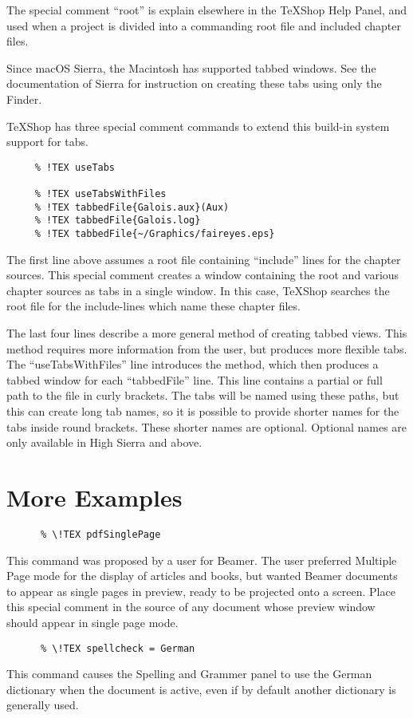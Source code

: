 \documentclass[11pt, oneside]{article}   	%
\begin{document}
 The special comment ``root'' is explain elsewhere in the TeXShop Help Panel, and used when a project is divided into a commanding root file and included chapter files. 
 
 Since macOS Sierra, the Macintosh has supported tabbed windows. See the documentation of Sierra for  instruction on creating these tabs using only the Finder. 
  
 TeXShop has three special comment commands to extend this build-in system support for tabs. 
 
 \begin{verbatim}
     % !TEX useTabs
	
     % !TEX useTabsWithFiles
     % !TEX tabbedFile{Galois.aux}(Aux)
     % !TEX tabbedFile{Galois.log}
     % !TEX tabbedFile{~/Graphics/faireyes.eps}
 \end{verbatim}
 The first line above assumes a root file containing ``include'' lines for the chapter sources. This special comment creates a window containing the root and various chapter sources as tabs in a single window.
 In this case, TeXShop searches the root file for the include-lines which name these chapter files.
 
 The last four lines describe a more general method of creating tabbed views. This method requires more
 information from the user, but produces more flexible tabs. The ``useTabsWithFiles'' line introduces the method, which then produces a tabbed window for each ``tabbedFile'' line. This line contains a partial or full path to the file in curly brackets. The tabs will be named using these paths, but this can create long tab names, so it is possible to provide  shorter names for the tabs inside round brackets. These
 shorter names are optional. Optional names are only available in High Sierra and above.
 
 \section{More Examples}
 \begin{verbatim}
      % \!TEX pdfSinglePage
 \end{verbatim}
 This command was proposed by a user for  Beamer. The user preferred Multiple Page mode for the  display of articles and books, but wanted Beamer documents to appear as single pages in preview, ready to be projected onto a screen. Place this special comment in the source of any document whose preview window should appear in single page mode.
 
  \begin{verbatim}
      % \!TEX spellcheck = German
 \end{verbatim}
 This command causes the Spelling and Grammer panel to use the German dictionary when the document is active, even if by default another dictionary is generally used.
 
\end{document}
